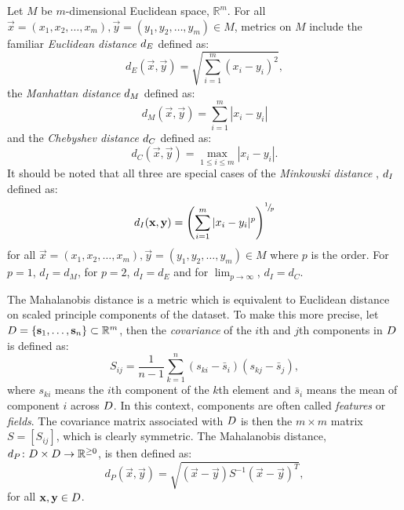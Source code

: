 Let $M$ be $m$-dimensional Euclidean space, $\mathbb{R}^m$.  For all
$\vec{x}=(x_1,x_2,\dotsc,x_m), \vec{y}=(y_1,y_2,\dotsc,y_m) \in M$, metrics on
$M$ include the familiar \textit{Euclidean distance} $d_{E}$ defined
as:
\begin{equation*}
  d_E(\vec{x},\vec{y}) = \sqrt{\sum_{i=1}^{m} (x_i - y_i)^2},
\end{equation*}
the \textit{Manhattan distance} $d_{M}$ defined as:
\begin{equation*}
  d_{M}(\vec{x},\vec{y}) = \sum_{i=1}^{m} |x_i - y_i|
\end{equation*}
and the \textit{Chebyshev distance} $d_{C}$ defined as:
\begin{equation*}
  d_C(\vec{x},\vec{y}) = \max_{1 \leq i \leq m} |x_i - y_i|.
\end{equation*}
It should be noted that all three are special cases of the \textit{Minkowski
  distance} \citep{deza2009encyclopedia}, $d_{I}$ defined as:
\begin{equation*}
  d_{I}(\mathbf{x},\mathbf{y}) = \left(\sum_{i=1}^{m} |x_i - y_i|^{p}\right)^{^1\!/\!_p}
\end{equation*}
for all $\vec{x}=(x_1,x_2,\dotsc,x_m), \vec{y}=(y_1,y_2,\dotsc,y_m) \in M$
where $p$ is the order.  For $p=1$, $d_I=d_M$, for $p=2$, $d_I=d_E$ and for
$\lim_{p \to \infty}$, $d_I=d_C$.

The Mahalanobis distance \citep{mahalanobis30distance} is a metric which is
equivalent to Euclidean distance on scaled principle components of the
dataset.  To make this more precise, let $D =
\{\mathbf{s}_1,\dotsc,\mathbf{s}_n\} \subset \mathbb{R}^m$, then the
\textit{covariance} of the $i$th and $j$th components in $D$ is defined
as:
\begin{equation*}
  S_{ij} = \frac{1}{n-1} \sum_{k=1}^{n} (s_{ki}-\bar{s}_i)(s_{kj}-\bar{s}_j),
\end{equation*}
where $s_{ki}$ means the $i$th component of the $k$th element and $\bar{s}_i$
means the mean of component $i$ across $D$.  In this context, components
are often called \textit{features} or \textit{fields}.  The covariance matrix
associated with $D$ is then the $m \times m$ matrix $S = [S_{ij}]$, which
is clearly symmetric.  The Mahalanobis distance, $d_{P} \colon D \times
D \to \mathbb{R}^{\geq 0}$, is then defined as:
\begin{equation*}
  d_{P}(\vec{x},\vec{y}) = \sqrt{(\vec{x}-\vec{y})S^{-1}(\vec{x}-\vec{y})^T},
\end{equation*}
for all $\mathbf{x},\mathbf{y} \in D$.

